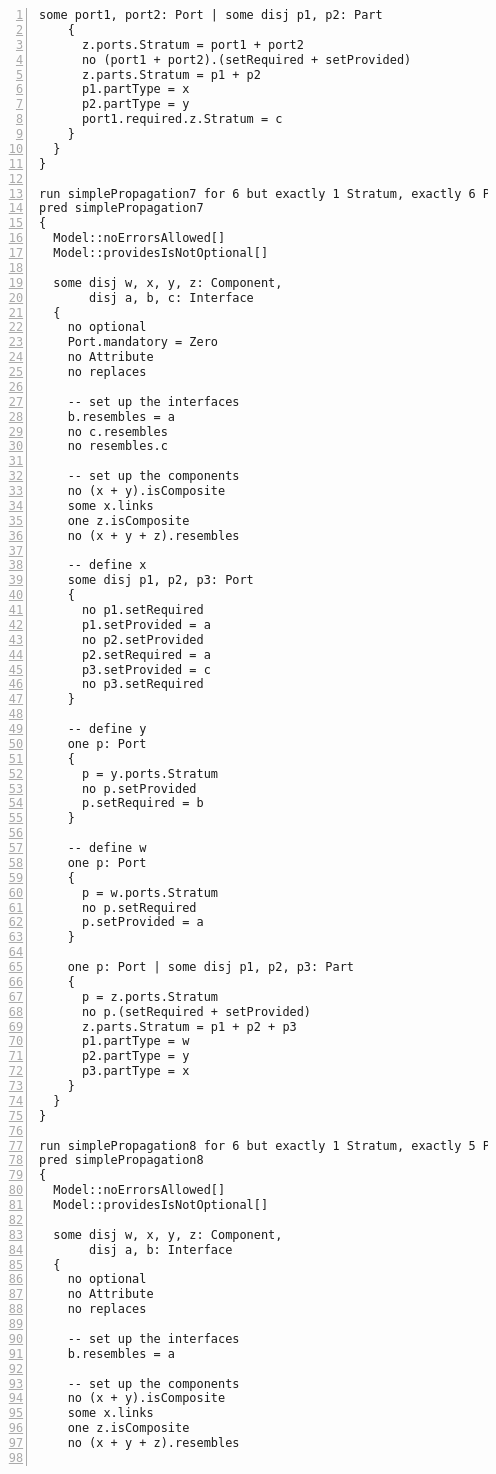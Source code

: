 \begin{lstlisting}[caption={unittests\_inference.als}, numbers=left]
    some port1, port2: Port | some disj p1, p2: Part
    {
      z.ports.Stratum = port1 + port2
      no (port1 + port2).(setRequired + setProvided)
      z.parts.Stratum = p1 + p2
      p1.partType = x
      p2.partType = y
      port1.required.z.Stratum = c
    }
  }
}

run simplePropagation7 for 6 but exactly 1 Stratum, exactly 6 Port, exactly 3 Part, exactly 4 Component, exactly 3 Interface, exactly 7 Element, 4 Connector, 11 LinkEnd, 8 ConnectorEnd
pred simplePropagation7
{
  Model::noErrorsAllowed[]
  Model::providesIsNotOptional[]

  some disj w, x, y, z: Component,
       disj a, b, c: Interface
  {
    no optional
    Port.mandatory = Zero
    no Attribute
    no replaces
  
    -- set up the interfaces
    b.resembles = a
    no c.resembles
    no resembles.c
  
    -- set up the components
    no (x + y).isComposite
    some x.links
    one z.isComposite
    no (x + y + z).resembles
    
    -- define x
    some disj p1, p2, p3: Port
    {
      no p1.setRequired
      p1.setProvided = a
      no p2.setProvided
      p2.setRequired = a
      p3.setProvided = c
      no p3.setRequired
    }
    
    -- define y
    one p: Port
    {
      p = y.ports.Stratum
      no p.setProvided
      p.setRequired = b
    }
    
    -- define w
    one p: Port
    {
      p = w.ports.Stratum
      no p.setRequired
      p.setProvided = a
    }
    
    one p: Port | some disj p1, p2, p3: Part
    {
      p = z.ports.Stratum
      no p.(setRequired + setProvided)
      z.parts.Stratum = p1 + p2 + p3
      p1.partType = w
      p2.partType = y
      p3.partType = x
    }
  }
}

run simplePropagation8 for 6 but exactly 1 Stratum, exactly 5 Port, exactly 3 Part, exactly 4 Component, exactly 2 Interface, exactly 6 Element, 3 Connector, 9 LinkEnd, 6 ConnectorEnd
pred simplePropagation8
{
  Model::noErrorsAllowed[]
  Model::providesIsNotOptional[]

  some disj w, x, y, z: Component,
       disj a, b: Interface
  {
    no optional
    no Attribute
    no replaces
  
    -- set up the interfaces
    b.resembles = a
  
    -- set up the components
    no (x + y).isComposite
    some x.links
    one z.isComposite
    no (x + y + z).resembles
    

\end{lstlisting}
